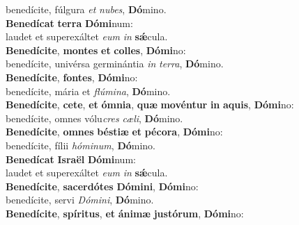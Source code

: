 \oddverse benedícite, fúlgura \textit{et} \textit{nu}\textit{bes}, \textbf{Dó}mino.\\
\evenverse \textbf{Be}\textbf{ne}\textbf{dí}\textbf{cat} \textbf{ter}\textbf{ra} \textbf{Dó}\textbf{mi}num:~\*\\
\evenverse laudet et superexáltet \textit{e}\textit{um} \textit{in} \textbf{sǽ}cula.\\
\oddverse \textbf{Be}\textbf{ne}\textbf{dí}\textbf{ci}\textbf{te}, \textbf{mon}\textbf{tes} \textbf{et} \textbf{col}\textbf{les}, \textbf{Dó}\textbf{mi}no:~\*\\
\oddverse benedícite, univérsa germinántia \textit{in} \textit{ter}\textit{ra}, \textbf{Dó}mino.\\
\evenverse \textbf{Be}\textbf{ne}\textbf{dí}\textbf{ci}\textbf{te}, \textbf{fon}\textbf{tes}, \textbf{Dó}\textbf{mi}no:~\*\\
\evenverse benedícite, mária et \textit{flú}\textit{mi}\textit{na}, \textbf{Dó}mino.\\
\oddverse \textbf{Be}\textbf{ne}\textbf{dí}\textbf{ci}\textbf{te}, \textbf{ce}\textbf{te}, \textbf{et} \textbf{óm}\textbf{ni}\textbf{a}, \textbf{quæ} \textbf{mo}\textbf{vén}\textbf{tur} \textbf{in} \textbf{a}\textbf{quis}, \textbf{Dó}\textbf{mi}no:~\*\\
\oddverse benedícite, omnes vólu\textit{cres} \textit{cæ}\textit{li}, \textbf{Dó}mino.\\
\evenverse \textbf{Be}\textbf{ne}\textbf{dí}\textbf{ci}\textbf{te}, \textbf{om}\textbf{nes} \textbf{bé}\textbf{sti}\textbf{æ} \textbf{et} \textbf{pé}\textbf{co}\textbf{ra}, \textbf{Dó}\textbf{mi}no:~\*\\
\evenverse benedícite, fílii \textit{hó}\textit{mi}\textit{num}, \textbf{Dó}mino.\\
\oddverse \textbf{Be}\textbf{ne}\textbf{dí}\textbf{cat} \textbf{Is}\textbf{ra}\textbf{ël} \textbf{Dó}\textbf{mi}num:~\*\\
\oddverse laudet et superexáltet \textit{e}\textit{um} \textit{in} \textbf{sǽ}cula.\\
\evenverse \textbf{Be}\textbf{ne}\textbf{dí}\textbf{ci}\textbf{te}, \textbf{sa}\textbf{cer}\textbf{dó}\textbf{tes} \textbf{Dó}\textbf{mi}\textbf{ni}, \textbf{Dó}\textbf{mi}no:~\*\\
\evenverse benedícite, servi \textit{Dó}\textit{mi}\textit{ni}, \textbf{Dó}mino.\\
\oddverse \textbf{Be}\textbf{ne}\textbf{dí}\textbf{ci}\textbf{te}, \textbf{spí}\textbf{ri}\textbf{tus}, \textbf{et} \textbf{á}\textbf{ni}\textbf{mæ} \textbf{ju}\textbf{stó}\textbf{rum}, \textbf{Dó}\textbf{mi}no:~\*\\
